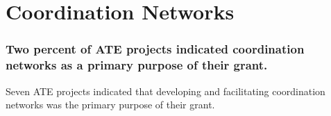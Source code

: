 \documentclass[
]{report}
\begin{document}
\hypertarget{coordination-networks}{%
\section{Coordination Networks}\label{coordination-networks}}

\hypertarget{two-percent-of-ate-projects-indicated-coordination-networks-as-a-primary-purpose-of-their-grant.}{%
\subsubsection{Two percent of ATE projects indicated coordination networks as a primary purpose of their grant.}\label{two-percent-of-ate-projects-indicated-coordination-networks-as-a-primary-purpose-of-their-grant.}}

Seven ATE projects indicated that developing and facilitating coordination networks was the primary purpose of their grant.
\end{document}
